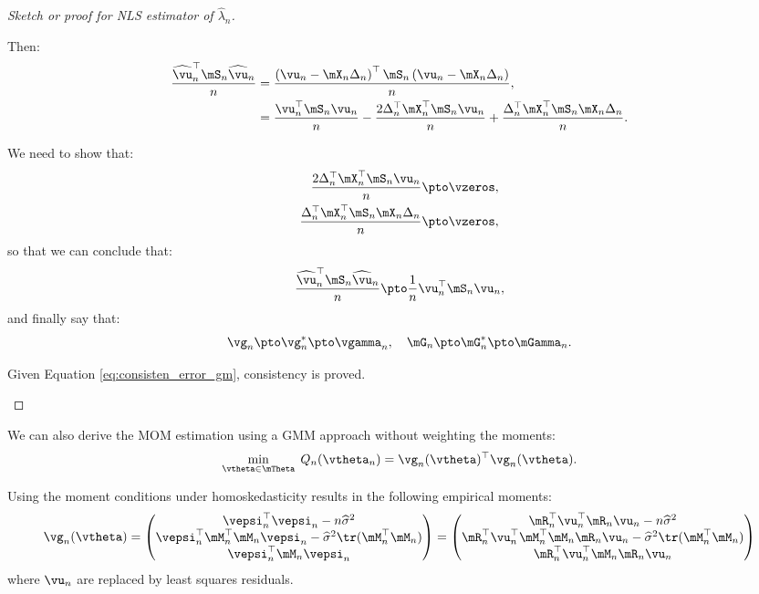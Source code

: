 \begin{proof}[Sketch or proof for NLS estimator of $\widehat{\lambda}_n$]
\begin{enumerate}
Then:
\begin{equation*}
\begin{aligned}
\frac{\widehat{\vu}^\top_n\mS_n\widehat{\vu}_n}{n} & = \frac{\left(\vu_n - \mX_n\Delta_n \right)^\top\mS_n\left(\vu_n - \mX_n\Delta_n \right)}{n}, \\
& = \frac{\vu^\top_n\mS_n\vu_n}{n}- \frac{2\Delta_n^\top\mX^\top_n\mS_n\vu_n}{n}+\frac{\Delta_n^\top\mX^\top_n\mS_n\mX_n\Delta_n}{n}.
\end{aligned}
\end{equation*}

We need to show that:
\begin{equation*}
\begin{aligned}
  \frac{2\Delta_n^\top\mX^\top_n\mS_n\vu_n}{n} & \pto \vzeros, \\
  \frac{\Delta_n^\top\mX^\top_n\mS_n\mX_n\Delta_n}{n} & \pto \vzeros,
\end{aligned}
\end{equation*}
%
so that we can conclude that:
\begin{equation*}
\frac{\widehat{\vu}^\top_n\mS_n\widehat{\vu}_n}{n}  \pto \frac{1}{n}\vu^\top_n\mS_n\vu_n,
\end{equation*}
%
and finally say that:
\begin{equation*}
\vg_n\pto \vg_n^*\pto \vgamma_n, \quad \mG_n\pto \mG^*_n\pto \mGamma_n.
\end{equation*}

Given Equation \eqref{eq:consisten_error_gm}, consistency is proved.
\end{enumerate}
\end{proof}

We can also derive the MOM estimation using a GMM approach without weighting the moments:
\begin{equation*}
\min_{\vtheta \in \mTheta}\; Q_n(\vtheta_n) = \vg_n(\vtheta)^\top \vg_n(\vtheta). 
\end{equation*}

Using the moment conditions under homoskedasticity results in the following empirical moments:
\begin{equation*}
  \vg_n(\vtheta)  = 
  \begin{pmatrix}
  \vepsi_n^\top\vepsi_n  - n\widehat{\sigma}^2 \\
  \vepsi_n^\top\mM_n^\top\mM_n\vepsi_n - \widehat{\sigma}^2\tr(\mM_n^\top\mM_n) \\
  \vepsi_n^\top\mM_n\vepsi_n 
  \end{pmatrix} =
  \begin{pmatrix}
   \mR_n^\top\vu_n^\top\mR_n\vu_n  - n\widehat{\sigma}^2 \\
   \mR_n^\top\vu_n^\top\mM_n^\top\mM_n\mR_n\vu_n - \widehat{\sigma}^2\tr(\mM_n^\top\mM_n) \\
   \mR_n^\top\vu_n^\top\mM_n\mR_n\vu_n
  \end{pmatrix}
\end{equation*}
%
where $\vu_n$ are replaced by least squares residuals. 

